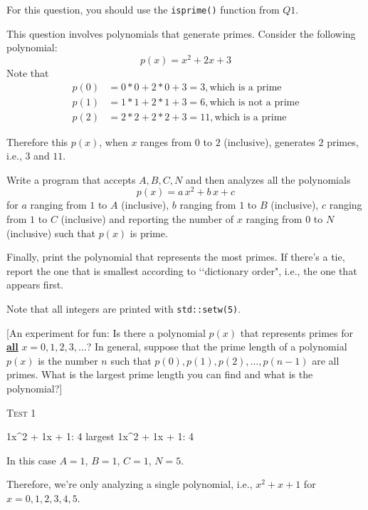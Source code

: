 For this question, you should use the \verb!isprime()! function from $Q1$.

This question involves polynomials that generate primes. Consider the
following polynomial:
\[p(x) = x^2 + 2x + 3\]
Note that
\begin{align*}
	p(0) &= 0 * 0 + 2 * 0 + 3 = 3, \text{which is a prime} \\
	p(1) &= 1 * 1 + 2 * 1 + 3 = 6, \text{which is not a prime} \\
	p(2) &= 2 * 2 + 2 * 2 + 3 = 11, \text{which is a prime}
\end{align*}

Therefore this $p(x)$, when $x$ ranges from $0$ to $2$ (inclusive), generates
$2$ primes, i.e., $3$ and $11$.

Write a program that accepts $A, B, C, N$ and then analyzes all the polynomials
\[p(x) = a\,x^2 + b\,x + c\]
for $a$ ranging from $1$ to $A$ (inclusive), $b$ ranging from $1$ to $B$
(inclusive), $c$ ranging from $1$ to $C$ (inclusive) and reporting the number
of $x$ ranging from $0$ to $N$ (inclusive) such that $p(x)$ is prime. 

Finally, print the polynomial that represents the most primes. If there's a 
tie, report the one that is smallest according to \lq\lq dictionary order",
i.e., the one that appears first.

Note that all integers are printed with \verb!std::setw(5)!.

[An experiment for fun: Is there a polynomial $p(x)$ that represents primes for
\underline{\bf all} $x = 0, 1, 2, 3, \dots$? In general, suppose that the prime
length of a polynomial $p(x)$ is the number $n$ such that $p(0), p(1), p(2),
\ldots, p(n-1)$ are all primes. What is the largest prime length you can find
and what is the polynomial?]

\textsc{Test 1}
\begin{console}[frame=single, commandchars=\\\{\}]
    1x^2 +     1x +     1:     4
largest
    1x^2 +     1x +     1:     4
\end{console}
In this case $A = 1$, $B = 1$, $C = 1$, $N = 5$.

Therefore, we're only analyzing a single polynomial, i.e.,
$x^2 + x + 1$ for $x = 0, 1, 2, 3, 4, 5$.

